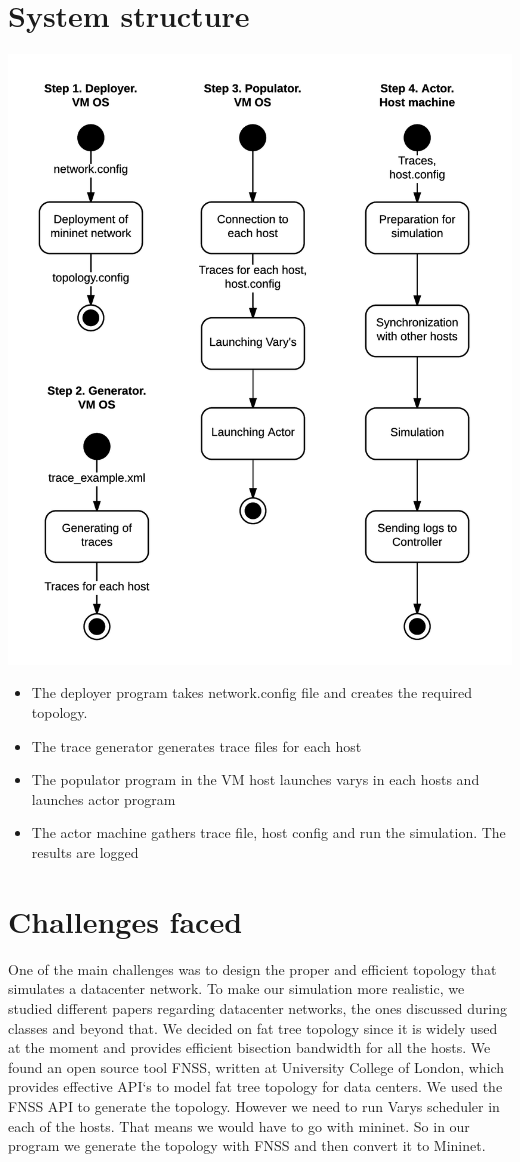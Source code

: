 \documentclass{article}
\begin{document}
\section{System structure}
\includegraphics[scale = 0.75]{flow_diagram}
\begin{itemize}
\item The deployer program takes network.config file and creates the required topology.
\item The trace generator generates trace files for each host
\item The populator program in the VM host launches varys in each hosts and launches actor program
\item The actor machine gathers trace file, host config and run the simulation. The results are logged
\end{itemize}

\section{Challenges faced}
One of the main challenges was to design the proper and efficient topology that simulates a datacenter network. To make our simulation more realistic, we studied different papers regarding datacenter networks, the ones discussed during classes and beyond that. We decided on fat tree topology since it is widely used at the moment and provides efficient bisection bandwidth for all the hosts. We found an open source tool FNSS, written at University College of London, which provides effective API`s to model fat tree topology for data centers. We used the FNSS API to generate the topology. However we need to run Varys scheduler in each of the hosts. That means we would have to go with mininet. So in our program we generate the topology with FNSS and then convert it to Mininet.
\end{document}
